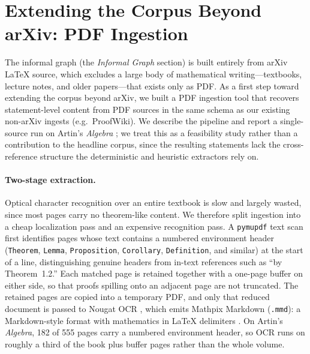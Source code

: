 \section{Extending the Corpus Beyond arXiv: PDF Ingestion}
\label{app:pdf-ingestion}

The informal graph (the \emph{Informal Graph} section) is built entirely from arXiv \LaTeX{} source, which excludes a large body of mathematical writing---textbooks, lecture notes, and older papers---that exists only as PDF. As a first step toward extending the corpus beyond arXiv, we built a PDF ingestion tool that recovers statement-level content from PDF sources in the same schema as our existing non-arXiv ingests (e.g.\ ProofWiki). We describe the pipeline and report a single-source run on Artin's \emph{Algebra} \cite{artin2011algebra}; we treat this as a feasibility study rather than a contribution to the headline corpus, since the resulting statements lack the cross-reference structure the deterministic and heuristic extractors rely on.

\paragraph{Two-stage extraction.}
Optical character recognition over an entire textbook is slow and largely wasted, since most pages carry no theorem-like content. We therefore split ingestion into a cheap localization pass and an expensive recognition pass. A \texttt{pymupdf} \cite{pymupdf2026} text scan first identifies pages whose text contains a numbered environment header (\texttt{Theorem}, \texttt{Lemma}, \texttt{Proposition}, \texttt{Corollary}, \texttt{Definition}, and similar) at the start of a line, distinguishing genuine headers from in-text references such as ``by Theorem~1.2.'' Each matched page is retained together with a one-page buffer on either side, so that proofs spilling onto an adjacent page are not truncated. The retained pages are copied into a temporary PDF, and only that reduced document is passed to Nougat OCR \cite{nougat-ocr}, which emits Mathpix Markdown (\texttt{.mmd}): a Markdown-style format with mathematics in \LaTeX{} delimiters \cite{mathpix_markdown}. On Artin's \emph{Algebra}, 182 of 555 pages carry a numbered environment header, so OCR runs on roughly a third of the book plus buffer pages rather than the whole volume.

